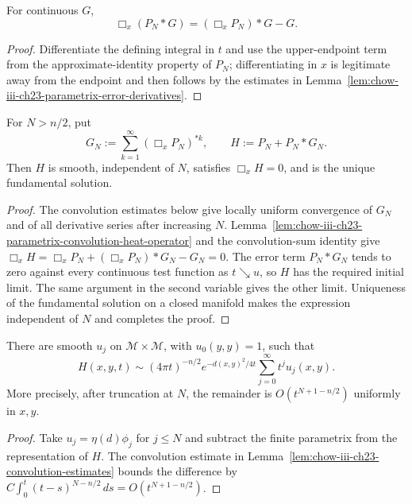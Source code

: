 \begin{lemma}
\label{lem:chow-iii-ch23-parametrix-convolution-heat-operator}
For continuous $G$,
\[
\Box_x(P_N*G)=(\Box_xP_N)*G-G.
\]
\end{lemma}
\begin{proof}
\sketch Differentiate the defining integral in $t$ and use the upper-endpoint term
from the approximate-identity property of $P_N$; differentiating in $x$ is
legitimate away from the endpoint and then follows by the estimates in
Lemma~\ref{lem:chow-iii-ch23-parametrix-error-derivatives}.
\end{proof}

\begin{theorem}
\label{thm:chow-iii-ch23-parametrix-heat-kernel}
For $N>n/2$, put
\[
G_N:=\sum_{k=1}^{\infty}(\Box_xP_N)^{*k},\qquad H:=P_N+P_N*G_N.
\]
Then $H$ is smooth, independent of $N$, satisfies $\Box_xH=0$, and is the
unique fundamental solution.
\end{theorem}
\begin{proof}
\sketch The convolution estimates below give locally uniform convergence of $G_N$ and
of all derivative series after increasing $N$.  Lemma~\ref{lem:chow-iii-ch23-parametrix-convolution-heat-operator} and the convolution-sum identity give
\(\Box_xH=\Box_xP_N+(\Box_xP_N)*G_N-G_N=0\).  The error term
\(P_N*G_N\) tends to zero against every continuous test function as $t\searrow u$,
so $H$ has the required initial limit.  The same argument in the second
variable gives the other limit.  Uniqueness of the fundamental solution on a
closed manifold makes the expression independent of $N$ and completes the
proof.
\end{proof}

\begin{theorem}
\label{thm:chow-iii-ch23-heat-kernel-expansion}
There are smooth $u_j$ on $\mathcal M\times\mathcal M$, with $u_0(y,y)=1$, such that
\[
H(x,y,t)\sim(4\pi t)^{-n/2}e^{-d(x,y)^2/4t}\sum_{j=0}^{\infty}t^ju_j(x,y).
\]
More precisely, after truncation at $N$, the remainder is
\(O(t^{N+1-n/2})\) uniformly in $x,y$.
\end{theorem}
\begin{proof}
\sketch Take $u_j=\eta(d)\phi_j$ for $j\le N$ and subtract the finite parametrix
from the representation of $H$.  The convolution estimate in
Lemma~\ref{lem:chow-iii-ch23-convolution-estimates} bounds the difference by
\(C\int_0^t(t-s)^{N-n/2}\,ds=O(t^{N+1-n/2})\).
\end{proof}

